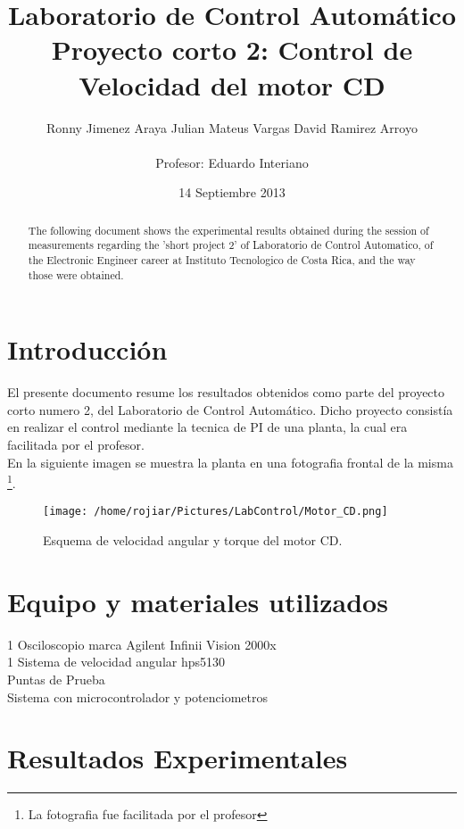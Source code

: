 \documentclass[a4paper,10pt,twocolumn]{article}
\title{\textbf{Laboratorio de Control Automático} \\ \textbf{Proyecto corto 2: Control de Velocidad del motor CD}}
\author{Ronny Jimenez Araya \hspace*{1cm} Julian Mateus Vargas \hspace*{1cm} David Ramirez Arroyo\\
\\Profesor: Eduardo Interiano}
\date{14 Septiembre 2013}
\begin{document}
\maketitle
\renewcommand{\figurename}{Figura}

\begin{abstract}

The following document shows the experimental results obtained during the session of measurements regarding the 'short project 2' 
of Laboratorio de Control Automatico, of the Electronic Engineer career at Instituto Tecnologico de Costa Rica, 
and the way those were obtained. 
\end{abstract}

\section{Introducción}

El presente documento resume los resultados obtenidos como parte del proyecto corto numero 2, del Laboratorio de Control Automático.
Dicho proyecto consistía en realizar el control mediante la tecnica de PI de una planta, la cual era facilitada por el profesor.\\

En la siguiente imagen se muestra la planta en una fotografia frontal de la misma \footnote{La fotografia fue facilitada por el profesor}.

\begin{figure}[h!]
\centering
\texttt{[image: /home/rojiar/Pictures/LabControl/Motor\_CD.png]}
\caption{Esquema de velocidad angular y torque del motor CD.}
\label{Esquema de velocidad angular y torque del motor CD utilizado}
\end{figure}

\section{Equipo y materiales utilizados}

1 Osciloscopio marca Agilent Infinii Vision 2000x
\\1 Sistema de velocidad angular hps5130
\\Puntas de Prueba
\\Sistema con microcontrolador y potenciometros


\section{Resultados Experimentales}
\end{document}
